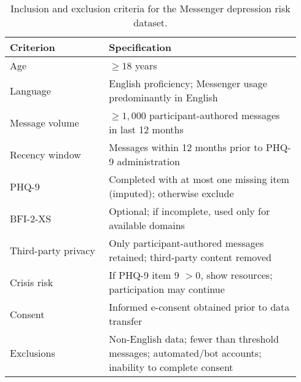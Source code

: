 \begin{table}[t]
\centering
\caption{Inclusion and exclusion criteria for the Messenger depression risk dataset.}
\label{tab:inclusion-criteria}
\begin{tabular}{p{0.32\linewidth}p{0.62\linewidth}}
\toprule
Criterion & Specification \\
\midrule
Age & \(\geq 18\) years \\
Language & English proficiency; Messenger usage predominantly in English \\
Message volume & \(\geq 1{,}000\) participant-authored messages in last 12 months \\
Recency window & Messages within 12 months prior to PHQ-9 administration \\
PHQ-9 & Completed with at most one missing item (imputed); otherwise exclude \\
BFI-2-XS & Optional; if incomplete, used only for available domains \\
Third-party privacy & Only participant-authored messages retained; third-party content removed \\
Crisis risk & If PHQ-9 item 9 \(>0\), show resources; participation may continue \\
Consent & Informed e-consent obtained prior to data transfer \\
Exclusions & Non-English data; fewer than threshold messages; automated/bot accounts; inability to complete consent \\
\bottomrule
\end{tabular}
\end{table}

